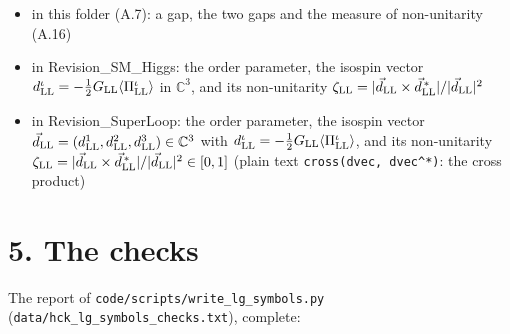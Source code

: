 \documentclass[
  10pt,
]{article}
\providecommand{\tightlist}{%
  \setlength{\itemsep}{0pt}\setlength{\parskip}{0pt}}
\begin{document}
\begin{itemize}
  \begin{itemize}
  \tightlist
  \item
    in this folder (A.7): a gap, the two gaps and the measure of
    non-unitarity (A.16)
  \item
    in Revision\_SM\_Higgs: the order parameter, the isospin vector
    \(d^\iota_{\rm LL}=-\tfrac12G_{\rm LL}\langle\Pi^\iota_{\rm LL}\rangle\)
    in \(\mathbb C^3\), and its non-unitarity
    \(\zeta_{\rm LL}=\lvert\vec d_{\rm LL}\times\vec d^{\,*}_{\rm LL}\rvert/\lvert\vec d_{\rm LL}\rvert^2\)
  \item
    in Revision\_SuperLoop: the order parameter, the isospin vector
    \(\vec d_{\rm LL}=(d^1_{\rm LL},d^2_{\rm LL},d^3_{\rm LL})\in\mathbb C^3\)
    with
    \(d^\iota_{\rm LL}=-\tfrac12G_{\rm LL}\langle\Pi^\iota_{\rm LL}\rangle\),
    and its non-unitarity
    \(\zeta_{\rm LL}=\lvert\vec d_{\rm LL}\times\vec d^{\,*}_{\rm LL}\rvert/\lvert\vec d_{\rm LL}\rvert^2\in[0,1]\)
    (plain text \texttt{cross(dvec,\ dvec\^{}*)}: the cross product)
  \end{itemize}
\end{itemize}

\hypertarget{the-checks}{%
\section{5. The checks}\label{the-checks}}

The report of \texttt{code/scripts/write\_lg\_symbols.py}
(\texttt{data/hck\_lg\_symbols\_checks.txt}), complete:
\end{document}
